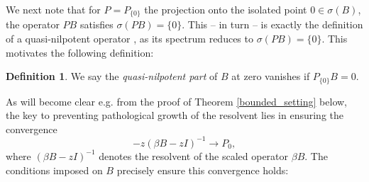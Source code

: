 \documentclass[reqno,12pt,letterpaper]{amsart}
\numberwithin{equation}{section}
\newcommand{\1}{\mathds{1}}
\theoremstyle{definition}
\newtheorem{Def}[Th]{Definition}
\begin{document}
We next note that for $P = P_{\{0\}} $ the projection onto the isolated point $0 \in \sigma(B)$,  the operator \( P  B \) satisfies \(  \sigma(P  B) = \{0\}\). This -- in turn -- is exactly the definition of a quasi-nilpotent operator \cite{HislopSigal1996, Triolo2024}, as its spectrum reduces to \(  \sigma(P  B) = \{0\}\). This motivates the following definition:
\begin{Def}
	We say the \emph{quasi-nilpotent part} of \( B \) at zero vanishes if
	$
	P_{\{0\}} B = 0.
	$
\end{Def}



As will become clear e.g. from the proof of Theorem \ref{bounded_setting} below, the key to preventing pathological growth of the resolvent lies in ensuring the convergence
\[
- z (\beta B - z I)^{-1} \longrightarrow P_0,
\]
where \((\beta B - z I)^{-1}\) denotes the resolvent of the scaled operator \(\beta B\). The conditions imposed on \( B \) precisely ensure this convergence holds:
\end{document}
